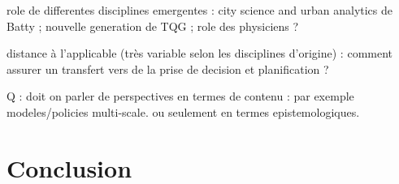  role de differentes disciplines emergentes : city science and urban analytics de Batty ; nouvelle generation de TQG ; role des physiciens ?

 distance à l'applicable (très variable selon les disciplines d'origine) : comment assurer un transfert vers de la prise de decision et planification ?

 Q : doit on parler de perspectives en termes de contenu : par exemple modeles/policies multi-scale. ou seulement en termes epistemologiques.





\section*{Conclusion}


















